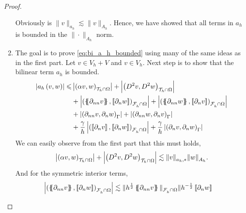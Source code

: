 \begin{proof}
\begin{enumerate}[label=\arabic*)]
             Obviously is $\| v \|_{a_{h}  }^{  } \lesssim \| v \|_{A_{h}  }^{  }$. Hence, we have showed that all terms in $a_{h}$ is bounded in the $\|\cdot   \|_{A_{h}  }^{  } $ norm.
         \item The goal is to prove \eqref{eq:bi_a_h_bounded} using many of the same ideas as in the first part. Let $v \in V_{h} +V $ and $v \in V_{h}$. Next step is to show that the bilinear term $ a_{h}$ is bounded.
                \begin{equation}
                    \begin{split}
                        \abs{ a_{h} \left( v, w \right) }   \le  &   \abs{\left( \alpha  v, w \right) _{\mathcal{T} _{h} \cap \Omega }  }    +  \abs{\left( D^2 v, D^2w \right) _{\mathcal{T} _{h} \cap \Omega}  }  \\
                                                     & + \abs{\left( \mean{  \partial _{n n} v }, \jump{ \partial _{n }w} \right)_{\mathcal{F}_{h}^{} \cap \Omega}  }   + \abs{\left( \mean{ \partial _{nn } w }, \jump{ \partial _{n}v }
                                                     \right)_{\mathcal{F}_{h}^{} \cap \Omega}  } \\
                                                     & + \abs{\left(  \partial _{n n} v ,  \partial _{n }w \right)_{\Gamma }}     +
                                                     \abs{\left(  \partial _{n n} w ,  \partial _{n}v       \right)_{\Gamma }  }
                                                     \\
                                                     & + \frac{\gamma }{h} \abs{ \left( \jump{ \partial _{n} v}, \jump{ \partial _{n} w   }   \right)_{\mathcal{F}_{h}^{} \cap \Omega}  } + \frac{\gamma }{h} \abs{ \left(  \partial _{n} v,  \partial _{n} w
                                                     \right)_{\Gamma }  }
                    \end{split}
                \end{equation}
                     We can easily observe from the first part that this must holds, \[
    \left\lvert \left( \alpha  v, w \right) _{\mathcal{T} _{h} \cap \Omega }   \right\rvert    +  \left\lvert \left( D^2 v, D^2w \right) _{\mathcal{T} _{h} \cap \Omega}   \right\rvert \lesssim \| v \|_{ a_{h},* }^{  } \| w \|_{A_{h}  }^{  }.
    \]
    And for the symmetric interior terms,
    \[
        \begin{split}
            \abs{\left( \mean{  \partial _{n n} v }, \jump{ \partial _{n }w} \right)_{\mathcal{F}_{h}^{} \cap \Omega}  } &\lesssim \| h^{\frac{1}{2}}\mean{ \partial _{nn}v }   \|_{ \mathcal{F}_{h}^{} \cap \Omega  }^{  } \| h^{-\frac{1}{2}}\jump{ \partial _{n }w}

\end{split}\]
\end{enumerate}
\end{proof}
